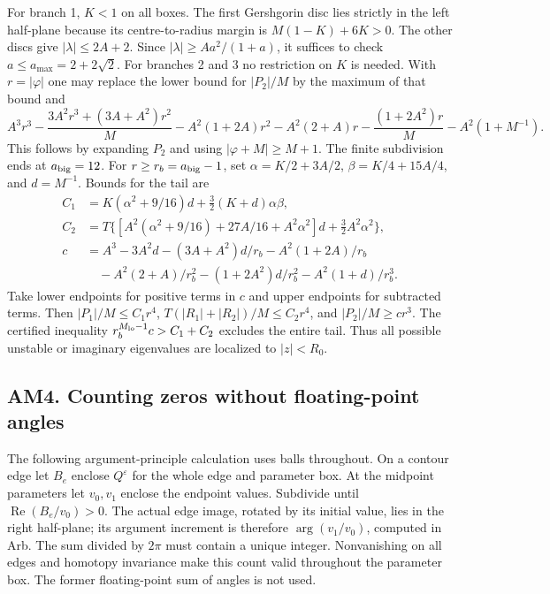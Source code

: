 For branch 1, $K<1$ on all boxes. The first Gershgorin disc lies strictly in the left
half-plane because its centre-to-radius margin is $M(1-K)+6K>0$. The other discs give
$|\lambda|\le2A+2$. Since $|\lambda|\ge Aa^2/(1+a)$, it suffices to check
$a\le a_{\max}=2+2\sqrt2$.
For branches 2 and 3 no restriction on $K$ is needed. With $r=|\varphi|$ one may replace
the lower bound for $|P_2|/M$ by the maximum of that bound and
\[
 A^3r^3-\frac{3A^2r^3+(3A+A^2)r^2}{M}-A^2(1+2A)r^2-A^2(2+A)r
       -\frac{(1+2A^2)r}{M}-A^2(1+M^{-1}).
\]
This follows by expanding $P_2$ and using $|\varphi+M|\ge M+1$.
The finite subdivision ends at $a_{\rm big}=12$. For $r\ge r_b=a_{\rm big}-1$, set
$\alpha=K/2+3A/2$, $\beta=K/4+15A/4$, and $d=M^{-1}$. Bounds for the tail are
\begin{align*}
 C_1&=K(\alpha^2+9/16)d+\tfrac32(K+d)\alpha\beta,\\
 C_2&=T\{[A^2(\alpha^2+9/16)+27A/16+A^2\alpha^2]d
                        +\tfrac32A^2\alpha^2\},\\
 c&=A^3-3A^2d-(3A+A^2)d/r_b-A^2(1+2A)/r_b\\
  &\hspace{1em}-A^2(2+A)/r_b^2-(1+2A^2)d/r_b^2-A^2(1+d)/r_b^3.
\end{align*}
Take lower endpoints for positive terms in $c$ and upper endpoints for subtracted terms.
Then $|P_1|/M\le C_1r^4$, $T(|R_1|+|R_2|)/M\le C_2r^4$, and $|P_2|/M\ge cr^3$.
The certified inequality $r_b^{M_{\rm lo}-1}c>C_1+C_2$ excludes the entire tail.
Thus all possible unstable or imaginary eigenvalues are localized to $|z|<R_0$.

\subsection{AM4. Counting zeros without floating-point angles}
The following argument-principle calculation uses balls throughout. On a contour edge let
$B_e$ enclose $Q^\varepsilon$ for the whole edge and parameter box. At the midpoint
parameters let $v_0,v_1$ enclose the endpoint values. Subdivide until
$\operatorname{Re}(B_e/v_0)>0$. The actual edge image, rotated by its initial value,
lies in the right half-plane; its argument increment is therefore
$\arg(v_1/v_0)$, computed in Arb. The sum divided by $2\pi$ must contain a unique
integer. Nonvanishing on all edges and homotopy invariance make this count valid
throughout the parameter box. The former floating-point sum of angles is not used.

